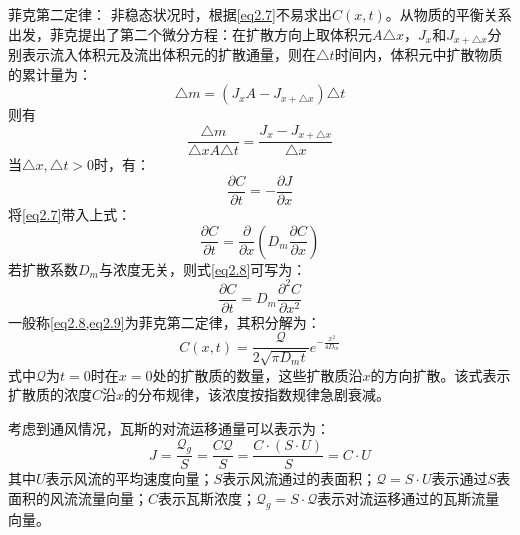 \textcolor[rgb]{1,0,0}{菲克第二定律}：
非稳态状况时，根据\cref{eq2.7}不易求出$C(x,t)$。从物质的平衡关系出发，菲克提出了第二个微分方程：在扩散方向上取体积元$A\triangle x$，$J_x$和$J_{x+\triangle x}$分别表示流入体积元及流出体积元的扩散通量，则在$\triangle t$时间内，体积元中扩散物质的累计量为：
\begin{equation*}
    \triangle m = (J_xA - J_{x+\triangle x})\triangle t
\end{equation*}
则有
\begin{equation*}
    \dfrac{\triangle m}{\triangle x A \triangle t} = \dfrac{J_x-J_{x+\triangle x}}{\triangle x}
\end{equation*}
当$\triangle x, \triangle t>0$时，有：
\begin{equation*}
    \dfrac{\partial C}{\partial t} = -\dfrac{\partial J}{\partial x}
\end{equation*}
将\cref{eq2.7}带入上式：
\begin{equation}
    \dfrac{\partial C}{\partial t} = \dfrac{\partial}{\partial x}\left(D_m \dfrac{\partial C}{\partial x}\right)
    \label{eq2.8}
\end{equation}
若扩散系数$D_m$与浓度无关，则式\cref{eq2.8}可写为：
\begin{equation}
    \dfrac{\partial C}{\partial t} = D_m \dfrac{\partial^2C}{\partial x^2}
    \label{eq2.9}
\end{equation}
一般称\cref{eq2.8,eq2.9}为菲克第二定律，其积分解为：
\begin{equation}
    C(x,t) = \dfrac{\mathcal{Q}}{2\sqrt{\pi D_m t}} e^{-\frac{x^2}{4D_m}}
    \label{eq2.10}
\end{equation}
式中$\mathcal{Q}$为$t=0$时在$x=0$处的扩散质的数量，这些扩散质沿$x$的方向扩散。该式表示扩散质的浓度$C$沿$x$的分布规律，该浓度按指数规律急剧衰减。


考虑到通风情况，瓦斯的对流运移通量可以表示为：
\begin{equation}
    J = \dfrac{\mathcal{Q}_g}{S} = \dfrac{C\mathcal{Q}}{S}=\dfrac{C\cdot(S\cdot U)}{S} = C \cdot U
    \label{eq-convectiveflux}
\end{equation}
其中$U$表示风流的平均速度向量；$S$表示风流通过的表面积；$\mathcal{Q} = S \cdot U$表示通过$S$表面积的风流流量向量；$C$表示瓦斯浓度；$\mathcal{Q}_g= S \cdot \mathcal{Q}$表示对流运移通过的瓦斯流量向量。


